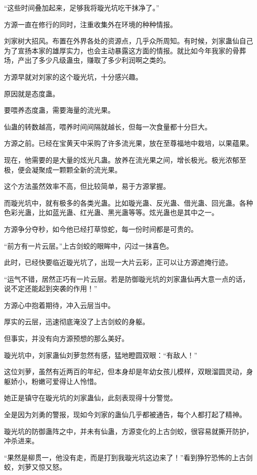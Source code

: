 \begin{this_body}
“这些时间叠加起来，足够我将璇光坑吃干抹净了。”

方源一直在修行的同时，注重收集外在环境的种种情报。

刘家树大招风。布置在外界各处的资源点，几乎众所周知。有时候，刘家蛊仙自己为了宣扬本家的雄厚实力，也会主动暴露这方面的情报。就比如今年我家的骨葬场，产出了多少凡级蛊虫，赚取了多少利润啊之类的。

方源早就对刘家的这个璇光坑，十分感兴趣。

原因就是态度蛊。

要喂养态度蛊，需要海量的流光果。

仙蛊的转数越高，喂养时间间隔就越长，但每一次食量都十分巨大。

方源之前。已经在宝黄天中采购了许多流光果，放在至尊福地中栽培，以果蕴果。

现在，他需要的是大量的炫光凡蛊。放养在流光果之间，增长极光。极光浓郁至极，便会凝聚成一颗颗全新的流光果。

这个方法虽然效率不高，但比较简单，易于方源掌握。

而璇光坑中，就有极多的各类光蛊。比如璇光蛊、反光蛊、借光蛊、回光蛊。各种色彩光蛊，比如蓝光蛊、红光蛊、黑光蛊等等。炫光蛊也是其中之一。

方源争分夺秒，如今他已经打草惊蛇，每一份时间都是可贵的。

“前方有一片云层。”上古剑蛟的眼眸中，闪过一抹喜色。

此时，已经快要临近璇光坑了，出现一大片云彩，正可以让方源遮掩行迹。

“运气不错，居然正巧有一片云层。若是防御璇光坑的刘家蛊仙再大意一点的话，说不定还能起到突袭的作用！”

方源心中抱着期待，冲入云层当中。

厚实的云层，迅速彻底淹没了上古剑蛟的身躯。

但事实，并没有向方源预想的那么美好。

璇光坑中，刘家蛊仙刘萝忽然有感，猛地瞪圆双眼：“有敌人！”

这位刘萝，虽然有近两百的年纪，但本身却是年幼女孩儿模样，双眼溜圆灵动，身躯娇小，粉嫩可爱得让人怜惜。

她正是镇守在璇光坑的刘家蛊仙，此刻表现得十分警觉。

全是因为刘勇的警报，现如今刘家的蛊仙几乎都被通告，每个人都打起了精神。

璇光坑的防御蛊阵之中，并未有仙蛊，方源变化的上古剑蛟，很容易就撕开防护，冲杀进来。

“果然是柳贯一，他没有走，而是打到我璇光坑这边来了！”看到狰狞恐怖的上古剑蛟，刘萝又惊又怒。


\end{this_body}
